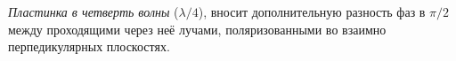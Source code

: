 


\textit{Пластинка в четверть волны} ($\lambda/4$), вносит дополнительную разность фаз в $\pi/2$ между проходящими через неё лучами, поляризованными во взаимно перпедикулярных плоскостях. 

